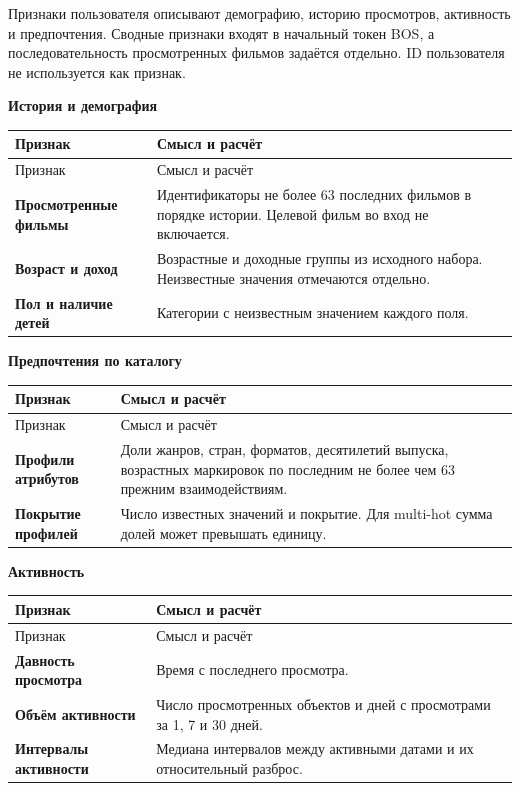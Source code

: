 \documentclass[11pt,a4paper]{article}
\begin{document}
Признаки пользователя описывают демографию, историю просмотров, активность и предпочтения. Сводные признаки входят в начальный токен BOS, а последовательность просмотренных фильмов задаётся отдельно. ID пользователя не используется как признак.

\textbf{История и демография}


\begin{longtable}{>{\raggedright\arraybackslash}p{4.1cm}>{\raggedright\arraybackslash}p{10.8cm}}
\toprule
Признак & Смысл и расчёт \\
\midrule
\endfirsthead
\toprule
Признак & Смысл и расчёт \\
\midrule
\endhead
\textbf{Просмотренные фильмы} & Идентификаторы не более 63 последних фильмов в порядке истории. Целевой фильм во вход не включается. \\[4pt]
\textbf{Возраст и доход} & Возрастные и доходные группы из исходного набора. Неизвестные значения отмечаются отдельно. \\[4pt]
\textbf{Пол и наличие детей} & Категории с неизвестным значением каждого поля. \\[4pt]
\bottomrule
\end{longtable}

\textbf{Предпочтения по каталогу}


\begin{longtable}{>{\raggedright\arraybackslash}p{4.1cm}>{\raggedright\arraybackslash}p{10.8cm}}
\toprule
Признак & Смысл и расчёт \\
\midrule
\endfirsthead
\toprule
Признак & Смысл и расчёт \\
\midrule
\endhead
\textbf{Профили атрибутов} & Доли жанров, стран, форматов, десятилетий выпуска, возрастных маркировок по последним не более чем 63 прежним взаимодействиям. \\[4pt]
\textbf{Покрытие профилей} & Число известных значений и покрытие. Для multi-hot сумма долей может превышать единицу. \\[4pt]
\bottomrule
\end{longtable}

\textbf{Активность}


\begin{longtable}{>{\raggedright\arraybackslash}p{4.1cm}>{\raggedright\arraybackslash}p{10.8cm}}
\toprule
Признак & Смысл и расчёт \\
\midrule
\endfirsthead
\toprule
Признак & Смысл и расчёт \\
\midrule
\endhead
\textbf{Давность просмотра} & Время с последнего просмотра. \\[4pt]
\textbf{Объём активности} & Число просмотренных объектов и дней с просмотрами за 1, 7 и 30 дней. \\[4pt]
\textbf{Интервалы активности} & Медиана интервалов между активными датами и их относительный разброс. \\[4pt]
\bottomrule
\end{longtable}
\end{document}
